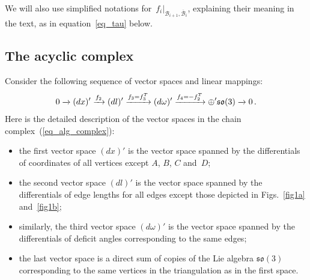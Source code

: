 \documentclass[11pt]{article}
\begin{document}
\begin{remark}\label{rem1B}
We will also use simplif\/ied notations for~$f_i|_{\mathcal B_{i+1}, \overline{\mathcal B}_i}$, explaining their meaning in the text, as in equation~\eqref{eq_tau} below.
\end{remark}

\subsection{The acyclic complex}

Consider the following sequence of vector spaces and linear mappings:
\begin{equation}
0\xrightarrow{} (dx)'\xrightarrow{f_2} (dl)' \xrightarrow{f_3=f_3^{\rm T}}(d\omega)' \xrightarrow{f_4=-f_2^{\rm T}} \oplus' \mathfrak{so}(3) \xrightarrow{} 0\,.
\label{eq_alg_complex}
\end{equation}
Here is the detailed description of the vector spaces in the chain complex~(\ref{eq_alg_complex}):
\begin{itemize}
\itemsep=0pt
  \item the f\/irst vector space $(dx)'$ is the vector space spanned by the dif\/ferentials of coordinates of all vertices except $A$, $B$, $C$ and~$D$;
  \item the second vector space $(dl)'$ is the vector space spanned by the dif\/ferentials of edge lengths for all edges except those depicted in Figs.~\ref{fig1a} and~\ref{fig1b};
  \item similarly, the third vector space $(d\omega)'$ is the vector space spanned by the dif\/ferentials of def\/icit angles corresponding to the same edges;
  \item the last vector space is a direct sum of copies of the Lie algebra $\mathfrak{so}(3)$ corresponding to the same vertices in the triangulation as in the f\/irst space.
\end{itemize}
\end{document}
